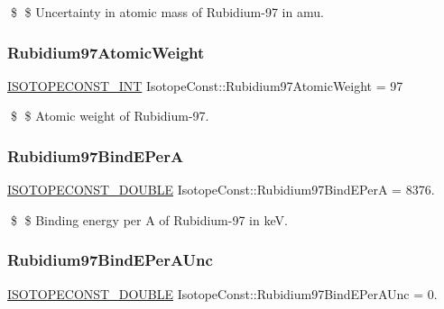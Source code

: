 \$ \$ Uncertainty in atomic mass of Rubidium-\/97 in amu. \mbox{\label{group___isotope_const-_rubidium-_rb97_ga24678db063dc7a5b808453cf4c1555b0}} 
\subsubsection{\texorpdfstring{Rubidium97\+Atomic\+Weight}{Rubidium97AtomicWeight}}
{\footnotesize\ttfamily \mbox{\hyperlink{group___isotope_const-_macros_ga5f18360b3e99483a35c32d789e62621c}{I\+S\+O\+T\+O\+P\+E\+C\+O\+N\+S\+T\+\_\+\+I\+NT}} Isotope\+Const\+::\+Rubidium97\+Atomic\+Weight = 97}

\$ \$ Atomic weight of Rubidium-\/97. \mbox{\label{group___isotope_const-_rubidium-_rb97_ga66fa5b80091edc9521c8852e840e4d7f}} 
\subsubsection{\texorpdfstring{Rubidium97\+Bind\+E\+PerA}{Rubidium97BindEPerA}}
{\footnotesize\ttfamily \mbox{\hyperlink{group___isotope_const-_macros_ga8f45a7272ce02c0b4c65c44636ed719a}{I\+S\+O\+T\+O\+P\+E\+C\+O\+N\+S\+T\+\_\+\+D\+O\+U\+B\+LE}} Isotope\+Const\+::\+Rubidium97\+Bind\+E\+PerA = 8376.}

\$ \$ Binding energy per A of Rubidium-\/97 in keV. \mbox{\label{group___isotope_const-_rubidium-_rb97_ga53ed079da86d9a7ae910091139d2ba17}} 
\subsubsection{\texorpdfstring{Rubidium97\+Bind\+E\+Per\+A\+Unc}{Rubidium97BindEPerAUnc}}
{\footnotesize\ttfamily \mbox{\hyperlink{group___isotope_const-_macros_ga8f45a7272ce02c0b4c65c44636ed719a}{I\+S\+O\+T\+O\+P\+E\+C\+O\+N\+S\+T\+\_\+\+D\+O\+U\+B\+LE}} Isotope\+Const\+::\+Rubidium97\+Bind\+E\+Per\+A\+Unc = 0.}

